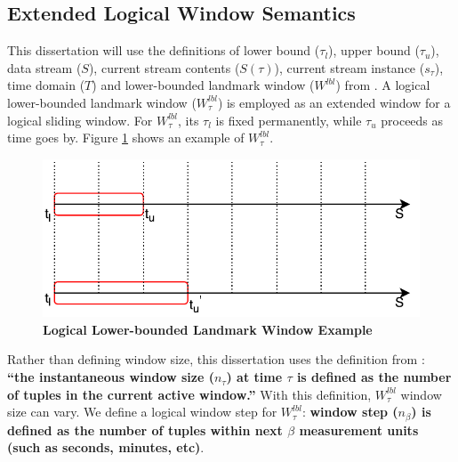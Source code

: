 \subsection{Extended Logical Window Semantics}
This dissertation will use the definitions of lower bound ($\tau_{l}$), upper bound ($\tau_{u}$), data stream ($S$), current stream contents ($S(\tau)$), current stream instance ($s_{\tau}$), time domain ($T$) and lower-bounded landmark window ($W^{lbl}$) from \cite{patroumpas2006window}.
A logical lower-bounded landmark window ($W^{lbl}_{\tau}$) is employed as an extended window for a logical sliding window.
For $W^{lbl}_{\tau}$, its $\tau_{l}$ is fixed permanently, while $\tau_{u}$ proceeds as time goes by. 
Figure \ref{fig:3-lw} shows an example of $W^{lbl}_{\tau}$. 

\begin{figure}[!htbp]
	\centering
    \includegraphics[width=5in]{img/3-lw.pdf}
    \caption{\textbf{Logical Lower-bounded Landmark Window Example}}
    \label{fig:3-lw}
\end{figure}

Rather than defining window size, this dissertation uses the definition from \cite{tangwongsan2015general}:
\textbf{``the instantaneous window size ($n_{\tau}$) at time $\tau$ is defined as the number of tuples in the current active window.''}
With this definition, $W^{lbl}_{\tau}$ window size can vary. 
We define a logical window step for $W^{lbl}_{\tau}$: 
\textbf{window step ($n_{\beta}$) is defined as the number of tuples within next $\beta$ measurement units  \cite{patroumpas2006window} (such as seconds, minutes, etc)}. 

